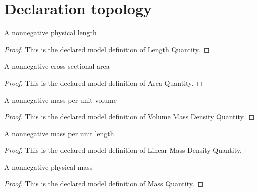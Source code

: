 \section{Declaration topology}
\begin{definition}
  \label{def:physics:phyx-mini-0299:phyxminiproblems-problemphyxmini0299-lengthquantity}
  A nonnegative physical length
\end{definition}
\begin{proof}
  This is the declared model definition of Length Quantity.
\end{proof}
\begin{definition}
  \label{def:physics:phyx-mini-0299:phyxminiproblems-problemphyxmini0299-areaquantity}
  A nonnegative cross-sectional area
\end{definition}
\begin{proof}
  This is the declared model definition of Area Quantity.
\end{proof}
\begin{definition}
  \label{def:physics:phyx-mini-0299:phyxminiproblems-problemphyxmini0299-volumemassdensityquantity}
  A nonnegative mass per unit volume
\end{definition}
\begin{proof}
  This is the declared model definition of Volume Mass Density Quantity.
\end{proof}
\begin{definition}
  \label{def:physics:phyx-mini-0299:phyxminiproblems-problemphyxmini0299-linearmassdensityquantity}
  A nonnegative mass per unit length
\end{definition}
\begin{proof}
  This is the declared model definition of Linear Mass Density Quantity.
\end{proof}
\begin{definition}
  \label{def:physics:phyx-mini-0299:phyxminiproblems-problemphyxmini0299-massquantity}
  A nonnegative physical mass
\end{definition}
\begin{proof}
  This is the declared model definition of Mass Quantity.
\end{proof}
